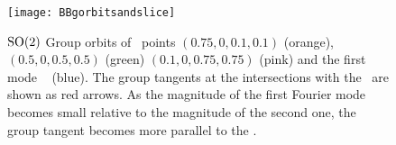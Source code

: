 
\begin{figure}%
\centering
 \texttt{[image: BBgorbitsandslice]}
\caption{$\textrm{SO}(2)$ Group orbits of \statesp\ points $(0.75, 0, 0.1, 0.1)$ (orange), $(0.5, 0, 0.5, 0.5)$ (green)
$(0.1, 0, 0.75, 0.75)$ (pink) and the first mode \slicePlane\
 (blue). The group tangents at the intersections with the \slicePlane\ are shown as red arrows.
As the magnitude of the first Fourier mode becomes small relative to the magnitude of the second one, the group tangent becomes more parallel to the \slicePlane.}
\label{fig:BBgorbitsandslice}
\end{figure}

